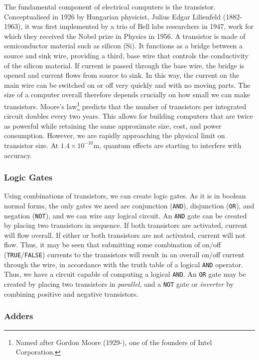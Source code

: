 \documentclass[11pt]{amsart}
\begin{document}
The fundamental component of electrical computers is the transistor. Conceptualised in 1926 by Hungarian physicist, Julius Edgar Lilienfeld (1882-1963), it was first implemented by a trio of Bell labs researchers in 1947, work for which they received the Nobel prize in Physics in 1956. A transistor is made of semiconductor material such as silicon (Si). It functions as a bridge between a source and sink wire, providing a third, base wire that controls the conductivity of the silicon material. If current is passed through the base wire, the bridge is opened and current flows from source to sink. In this way, the current on the main wire can be switched on or off very quickly and with no moving parts. The size of a computer overall therefore depends crucially on how small we can make transistors. Moore's law\footnote{Named after Gordon Moore (1929-), one of the founders of Intel Corporation.} predicts that the number of transistors per integrated circuit doubles every two years. This allows for building computers that are twice as powerful while retaining the same approximate size, cost, and power consumption. However, we are rapidly approaching the physical limit on transistor size. At $1.4 \times 10^{-10}\text{m}$, quantum effects are starting to interfere with accuracy.

\subsubsection{Logic Gates}

Using combinations of transistors, we can create logic gates. As it is in boolean normal forms, the only gates we need are conjunction (\texttt{AND}), disjunction (\texttt{OR}), and negation (\texttt{NOT}), and we can wire any logical circuit. An \texttt{AND} gate can be created by placing two transistors in sequence. If both transistors are activated, current will flow overall. If either or both transistors are not activated, current will not flow. Thus, it may be seen that submitting some combination of on/off (\texttt{TRUE}/\texttt{FALSE}) currents to the transistors will result in an overall on/off current through the wire, in accordance with the truth table of a logical \texttt{AND} operator. Thus, we have a circuit capable of computing a logical \texttt{AND}. An \texttt{OR} gate may be created by placing two transistors in \emph{parallel}, and a \texttt{NOT} gate or \emph{inverter} by combining positive and negative transistors.

\subsubsection{Adders}
\end{document}
